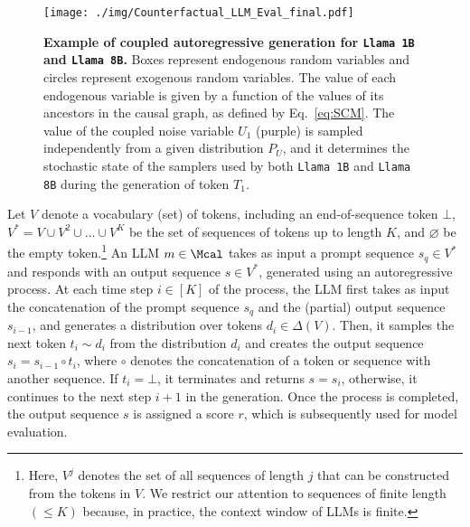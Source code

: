 \begin{figure}
    \centering
    \texttt{[image: ./img/Counterfactual\_LLM\_Eval\_final.pdf]}
    \caption{{\bf Example of coupled autoregressive generation for \texttt{Llama 1B} and \texttt{Llama 8B}.} Boxes represent endogenous random variables and circles represent exogenous random variables. The value of each endogenous variable is given by a function of the values of its ancestors in the causal graph, as defined by Eq.~\ref{eq:SCM}. The value of the coupled noise variable $U_1$ (purple) is sampled independently from a given distribution $P_U$, and it determines the stochastic state of the samplers used by both \texttt{Llama 1B} and \texttt{Llama 8B} during the generation of token $T_1$.}
    \label{fig:scm}
\end{figure}

Let $V$ denote a vocabulary (set) of tokens, including an end-of-sequence token $\bot$, 
%
$V^*=V\cup V^2 \cup \dots \cup V^K$ be the set of sequences of tokens up to length $K$, 
%
and $\varnothing$ be the empty token.\footnote{Here, $V^j$ denotes the set of all sequences of length $j$ that can be constructed from the tokens in $V$. We restrict our attention to sequences of finite length $(\leq K)$ because, in practice, the context window of LLMs is finite.}
%
An LLM $m \in \Mcal$ takes as input a prompt sequence $s_q \in V^*$ and responds with an output sequence $s \in V^*$, generated using an autoregressive process. 
%
At each time step $i \in [K]$ of the process, the LLM first takes as input the concatenation of the prompt sequence $s_q$ and the (partial) output sequence $s_{i-1}$, and generates a distribution over tokens $d_{i} \in \Delta(V)$. 
%
Then, it samples the next token $t_{i} \sim d_{i}$ from the distribution $d_{i}$ and creates the output sequence $s_{i} = s_{i-1} \circ t_{i}$, where $\circ$ denotes the concatenation of a token or sequence with another sequence.
%
If $t_{i} = \bot$, it terminates and returns $s = s_i$, otherwise, it continues to the next step $i+1$ in the generation. 
%
Once the process is completed, the output sequence $s$ is assigned a score $r$, which is subsequently used for model evaluation.

